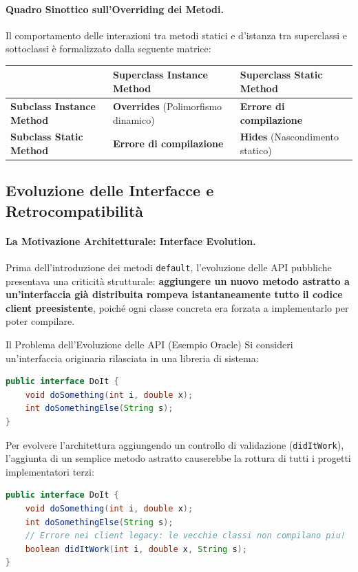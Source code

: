 \documentclass[12pt]{extarticle}
\begin{document}
\paragraph{Quadro Sinottico sull'Overriding dei Metodi.}
Il comportamento delle interazioni tra metodi statici e d'istanza tra superclassi e sottoclassi è formalizzato dalla seguente matrice:

\begin{center}
\small
\begin{tabular}{p{4.2cm}p{4.8cm}p{4.8cm}}
    \toprule
    & \textbf{Superclass Instance Method} & \textbf{Superclass Static Method} \\
    \midrule
    \textbf{Subclass Instance Method} & \textbf{Overrides} (Polimorfismo dinamico) & \textbf{Errore di compilazione} \\
    \addlinespace
    \textbf{Subclass Static Method} & \textbf{Errore di compilazione} & \textbf{Hides} (Nascondimento statico) \\
    \bottomrule
\end{tabular}
\end{center}

\subsection{Evoluzione delle Interfacce e Retrocompatibilità}

\paragraph{La Motivazione Architetturale: Interface Evolution.}
Prima dell'introduzione dei metodi \texttt{default}, l'evoluzione delle API pubbliche presentava una criticità strutturale: \textbf{aggiungere un nuovo metodo astratto a un'interfaccia già distribuita rompeva istantaneamente tutto il codice client preesistente}, poiché ogni classe concreta era forzata a implementarlo per poter compilare.

\begin{cbox}{Il Problema dell'Evoluzione delle API (Esempio Oracle)}
Si consideri un'interfaccia originaria rilasciata in una libreria di sistema:
\begin{lstlisting}[language=Java]
public interface DoIt {
    void doSomething(int i, double x);
    int doSomethingElse(String s);
}
\end{lstlisting}
Per evolvere l'architettura aggiungendo un controllo di validazione (\texttt{didItWork}), l'aggiunta di un semplice metodo astratto causerebbe la rottura di tutti i progetti implementatori terzi:
\begin{lstlisting}[language=Java]
public interface DoIt {
    void doSomething(int i, double x);
    int doSomethingElse(String s);
    // Errore nei client legacy: le vecchie classi non compilano piu!
    boolean didItWork(int i, double x, String s);
}
\end{lstlisting}
\end{cbox}
\end{document}
